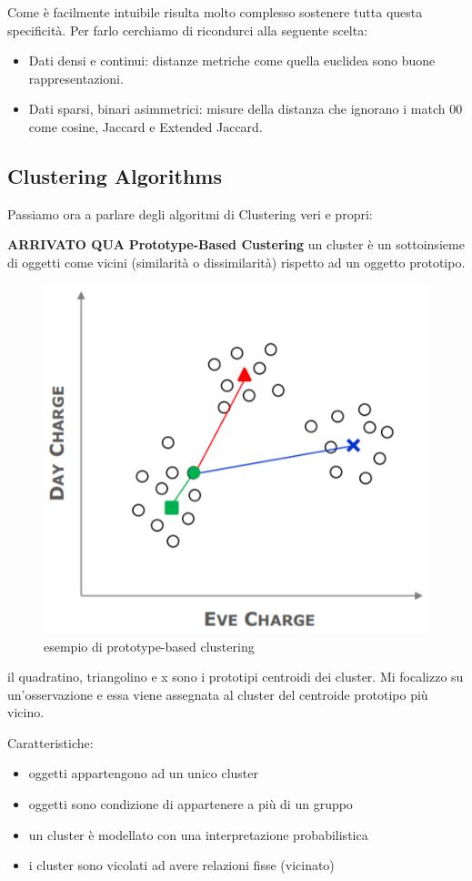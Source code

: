 Come è facilmente intuibile risulta molto complesso sostenere tutta questa specificità. Per farlo cerchiamo di ricondurci alla seguente scelta:
\begin{itemize}
	\item Dati densi e continui: distanze metriche  come quella euclidea sono buone rappresentazioni.
	\item Dati sparsi, binari asimmetrici: misure della distanza che ignorano i match 00 come cosine, Jaccard e Extended Jaccard.
\end{itemize}

\subsection{Clustering Algorithms}

Passiamo ora a parlare degli algoritmi di Clustering veri e propri:

\textbf{ARRIVATO QUA}
\textbf{Prototype-Based Custering} un cluster \`e un sottoinsieme di oggetti come vicini (similarit\`a o dissimilarit\`a) rispetto ad un oggetto prototipo. 

\begin{figure}[h!]
	\centering
	\includegraphics[height=0.4 \linewidth]{clustering/pict/prototype_cluster.png}
	\caption{esempio di prototype-based clustering}
\end{figure}

il quadratino, triangolino e x sono i prototipi centroidi dei cluster. Mi focalizzo su un'osservazione e essa viene assegnata al cluster del centroide prototipo pi\`u vicino.

Caratteristiche:
\begin{itemize}
	\item oggetti appartengono ad un unico cluster
	\item oggetti sono condizione di appartenere a pi\`u di un gruppo
	\item un cluster \`e modellato con una interpretazione probabilistica
	\item i cluster sono vicolati ad avere relazioni fisse (vicinato)
\end{itemize}

